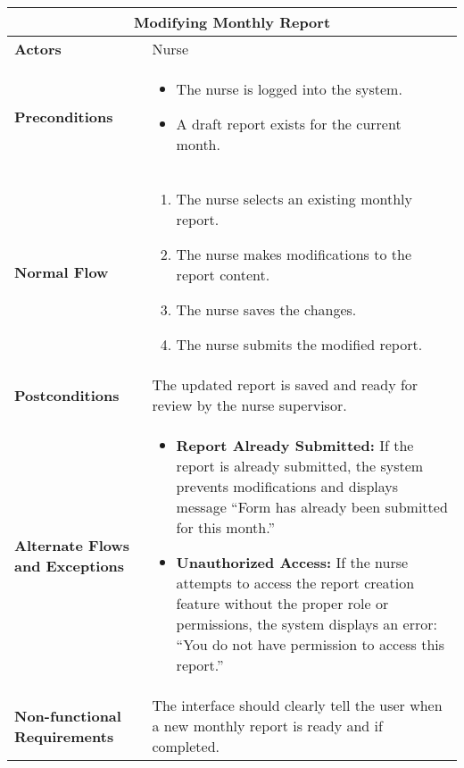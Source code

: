 \documentclass{article}
\begin{document}
\begin{longtable}{| p{5cm} | p{10cm} |}
    \hline
    \multicolumn{2}{|c|}{\textbf{Modifying Monthly Report}} \\
    \hline
    \textbf{Actors} & Nurse \\
    \hline
    \textbf{Preconditions} & 
    \begin{itemize}
        \item The nurse is logged into the system.
        \item A draft report exists for the current month.
    \end{itemize} \\
    \hline
    \textbf{Normal Flow} & 
    \begin{enumerate}
        \item The nurse selects an existing monthly report.
        \item The nurse makes modifications to the report content.
        \item The nurse saves the changes.
        \item The nurse submits the modified report.
    \end{enumerate} \\
    \hline
    \textbf{Postconditions} & The updated report is saved and ready for review by the nurse supervisor. \\
    \hline
    \textbf{Alternate Flows and Exceptions} & 
    \begin{itemize}
        \item \textbf{Report Already Submitted:} If the report is already submitted, the system prevents modifications and displays message “Form has already been submitted for this month.”
        \item \textbf{Unauthorized Access:} If the nurse attempts to access the report creation feature without the proper role or permissions, the system displays an error: “You do not have permission to access this report.”
    \end{itemize} \\
    \hline
    \textbf{Non-functional Requirements} & The interface should clearly tell the user when a new monthly report is ready and if completed. \\
    \hline
\end{longtable}
\end{document}
